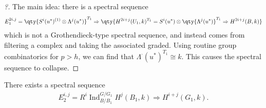 \begin{proof}[?]

The main idea: there is a spectral sequence
\begin{align*}  
E_1^{2i, j} = \qty{  
S^i(u^*)^{(1)} \otimes\Lambda^j(u^*)
}^{T_1}
\Rightarrow
\qty{ 
H^{2i+j}(U_1, k)^{T_1} = S^i(u^*) \otimes\qty{ \Lambda^j(u^*) }^{T_1} \Rightarrow H^{2i+j}(B, k)
}
\end{align*}
which is not a Grothendieck-type spectral sequence, and instead comes
from filtering a complex and taking the associated graded. Using routine
group combinatorics for \(p>h\), we can find that
\(\Lambda^\cdot(u^*)^{T_1} \cong k\). This causes the spectral sequence
to collapse.

\end{proof}

\begin{proposition}[?]

There exists a spectral sequence
\begin{align*}  
E_2^{i, j} = R^i \operatorname{Ind}_{B/B_1}^{G/G_1} H^j(B_1, k) \Rightarrow H^{i+j}(G_1, k)
.\end{align*}

\end{proposition}

